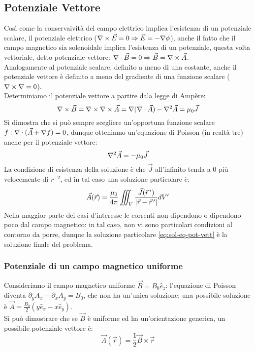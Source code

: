 \subsection{Potenziale Vettore}

Così come la conservaività del campo elettrico implica l'esistenza di un potenziale scalare, il potenziale elettrico ($ \nabla\times\vec{E} = 0 \Rightarrow \vec{E} = - \nabla \phi $), anche  il fatto che il campo magnetico sia solenoidale implica l'esistenza di un potenziale, questa volta vettoriale, detto potenziale vettore: $ \nabla\cdot\vec{B} = 0 \Rightarrow \vec{B} = \nabla\times\vec{A} $. \\ 
%
Analogamente al potenziale scalare, definito a meno di una costante, anche il potenziale vettore è definito a meno del gradiente di una funzione scalare ($ \nabla\times\nabla = 0 $). \\ 
%
Determiniamo il potenziale vettore a partire dala legge di Ampère:
\begin{equation}
	\nabla\times\vec{B} = \nabla\times\nabla\times\vec{A} = \nabla(\nabla\cdot\vec{A}) - \nabla^2\vec{A} = \mu_0 \vec{J}
	\label{eq:}
\end{equation}
Si dimostra che si può sempre scegliere un'opportuna funzione scalare $ f : \nabla\cdot(\vec{A} + \nabla f) = 0 $, dunque otteniamo un'equazione di Poisson (in realtà tre) anche per il potenziale vettore:
\begin{equation}
	\nabla^2\vec{A} = - \mu_0 \vec{J}
	\label{eq:eq-pot-vett}
\end{equation}
La condizione di esistenza della soluzione è che $ \vec{J} $ all'infinito tenda a $ 0 $ più velocemente di $ r^{-2} $, ed in tal caso una soluzione particolare è:
\begin{equation}
	\vec{A}(\vec{r}) = \displaystyle\frac{\mu_0}{4\pi} \iiint_V \displaystyle\frac{\vec{J}(\vec{r}\,')}{\left\lvert\vec{r} - \vec{r}\,'\right\rvert} dV'
	\label{eq:sol-eq-pot-vett}
\end{equation}
Nella maggior parte dei casi d'interesse le correnti non dipendono o dipendono poco dal campo magnetico: in tal caso, non vi sono particolari condizioni al contorno da porre, dunque la soluzione particolare \ref{eq:sol-eq-pot-vett} è la soluzione finale del problema.

\subsubsection{Potenziale di un campo magnetico uniforme}

Consideriamo il campo magnetico uniforme $ \vec{B} = B_0 \hat{e}_z $: l'equazione di Poisson diventa $ \partial_y A_x - \partial_x A_y = B_0 $, che non ha un'unica soluzione; una possibile soluzione è $ \vec{A} = \frac{B_0}{2} (y\hat{e}_x - x\hat{e}_y) $. \\ 
%
Si può dimostrare che se $\vec{B} $ è uniforme ed ha un'orientazione generica, un possibile potenziale vettore è:
\begin{equation}
	\vec{A}(\vec{r}) = \displaystyle\frac{1}{2} \vec{B}\times\vec{r}
	\label{eq:pot-b-unif}
\end{equation}

